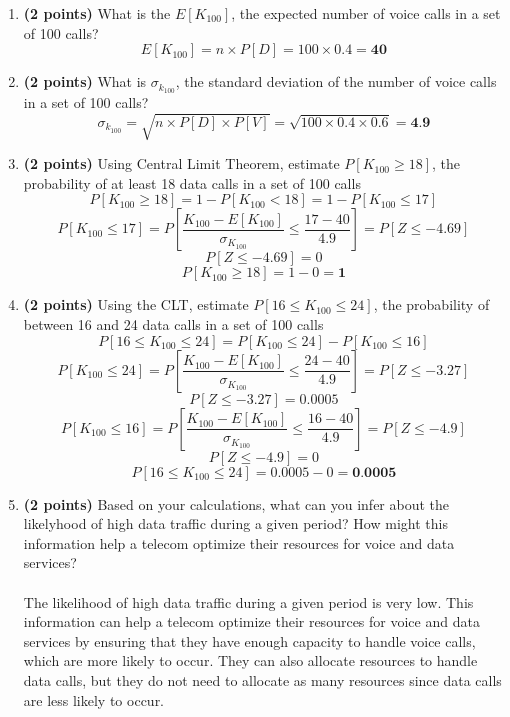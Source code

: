 \documentclass[a3paper,12pt]{extarticle} %
\begin{document}
    \begin{enumerate}
        \item \textbf{(2 points)} What is the \(E[K_{100}]\), the expected number of voice calls in a set of 100 calls?
        \[
        E[K_{100}] = n \times P[D] = 100 \times 0.4 = \textbf{40}
        \]
        \item \textbf{(2 points)} What is \(\sigma_{k_{100}}\), the standard deviation of the number of voice calls in a set of 100 calls?
        \[
        \sigma_{k_{100}} = \sqrt{n \times P[D] \times P[V]} = \sqrt{100 \times 0.4 \times 0.6} = \textbf{4.9}
        \]
        \item \textbf{(2 points)} Using Central Limit  Theorem, estimate \(P[K_{100} \geq  18]\), the probability of at least 18 data calls in a set of 100 calls
        \[
        P[K_{100} \geq 18] = 1 - P[K_{100} < 18] = 1 - P[K_{100} \leq 17]
        \]
        \[
        P[K_{100} \leq 17] = P\left[\frac{K_{100} - E[K_{100}]}{\sigma_{K_{100}}} \leq \frac{17 - 40}{4.9}\right] = P[Z \leq -4.69]
        \]
        \[
        P[Z \leq -4.69] = 0
        \]
        \[
        P[K_{100} \geq 18] = 1 - 0 = \textbf{1}
        \]
        \item \textbf{(2 points)} Using the CLT, estimate \(P[16 \leq K_{100} \leq  24]\), the probability of between 16 and 24 data calls in a set of 100 calls
        \[
        P[16 \leq K_{100} \leq 24] = P[K_{100} \leq 24] - P[K_{100} \leq 16]
        \]
        \[
        P[K_{100} \leq 24] = P\left[\frac{K_{100} - E[K_{100}]}{\sigma_{K_{100}}} \leq \frac{24 - 40}{4.9}\right] = P[Z \leq -3.27]
        \]
        \[
        P[Z \leq -3.27] = 0.0005
        \]
        \[
        P[K_{100} \leq 16] = P\left[\frac{K_{100} - E[K_{100}]}{\sigma_{K_{100}}} \leq \frac{16 - 40}{4.9}\right] = P[Z \leq -4.9]
        \]
        \[
        P[Z \leq -4.9] = 0
        \]
        \[
        P[16 \leq K_{100} \leq 24] = 0.0005 - 0 = \textbf{0.0005}
        \]
        \item \textbf{(2 points)} Based on your calculations, what can you infer about the likelyhood of high data traffic during a given period? How might this information help a telecom optimize their resources for voice and data services?
        \\\\ The likelihood of high data traffic during a given period is very low. This information can help a telecom optimize their resources for voice and data services by ensuring that they have enough capacity to handle voice calls, which are more likely to occur. They can also allocate resources to handle data calls, but they do not need to allocate as many resources since data calls are less likely to occur.
    \end{enumerate}
\end{document}
